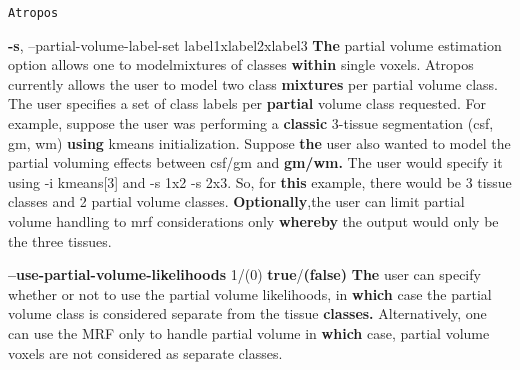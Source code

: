 \documentclass[ignorenonframetext,]{beamer}
\newenvironment{Shaded}{\begin{snugshade}}{\end{snugshade}}
\newcommand{\KeywordTok}[1]{\textcolor[rgb]{0.13,0.29,0.53}{\textbf{{#1}}}}
\newcommand{\NormalTok}[1]{{#1}}
\begin{document}
\begin{frame}[fragile]{\texttt{Atropos}}
\begin{Shaded}
\begin{Highlighting}[]
     \KeywordTok{-s}\NormalTok{, --partial-volume-label-set label1xlabel2xlabel3}
          \KeywordTok{The} \NormalTok{partial volume estimation option allows one to modelmixtures of classes}
          \KeywordTok{within} \NormalTok{single voxels. Atropos currently allows the user to model two class}
          \KeywordTok{mixtures} \NormalTok{per partial volume class. The user specifies a set of class labels per}
          \KeywordTok{partial} \NormalTok{volume class requested. For example, suppose the user was performing a}
          \KeywordTok{classic} \NormalTok{3-tissue segmentation (csf, gm, wm) }\KeywordTok{using} \NormalTok{kmeans initialization. Suppose}
          \KeywordTok{the} \NormalTok{user also wanted to model the partial voluming effects between csf/gm and}
          \KeywordTok{gm/wm.} \NormalTok{The user would specify it using -i kmeans[3] and -s 1x2 -s 2x3. So, for}
          \KeywordTok{this} \NormalTok{example, there would be 3 tissue classes and 2 partial volume classes.}
          \KeywordTok{Optionally}\NormalTok{,the user can limit partial volume handling to mrf considerations only}
          \KeywordTok{whereby} \NormalTok{the output would only be the three tissues.}

     \KeywordTok{--use-partial-volume-likelihoods} \NormalTok{1/(0)}
                                      \KeywordTok{true}\NormalTok{/}\KeywordTok{(false)}
          \KeywordTok{The} \NormalTok{user can specify whether or not to use the partial volume likelihoods, in}
          \KeywordTok{which} \NormalTok{case the partial volume class is considered separate from the tissue}
          \KeywordTok{classes.} \NormalTok{Alternatively, one can use the MRF only to handle partial volume in}
          \KeywordTok{which} \NormalTok{case, partial volume voxels are not considered as separate classes.}


\end{Highlighting}
\end{Shaded}
\end{frame}
\end{document}
